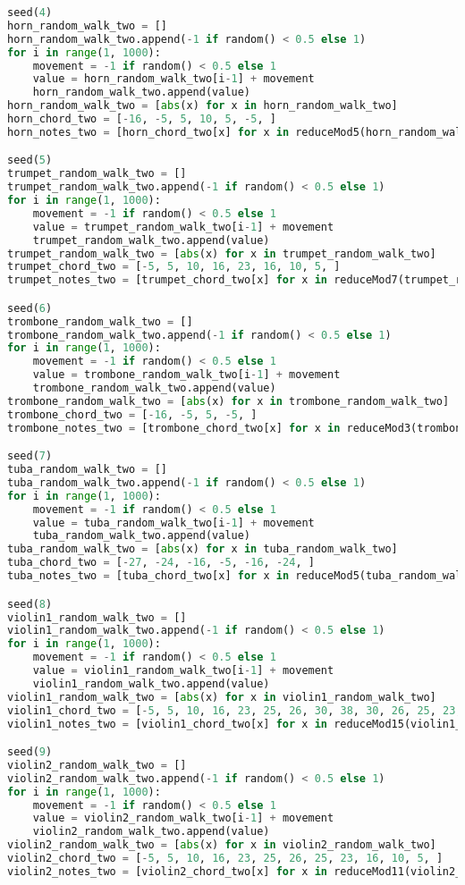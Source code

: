 \begin{lstlisting}[language=Python, caption=Tianshu Segment\_I]
seed(4)
horn_random_walk_two = []
horn_random_walk_two.append(-1 if random() < 0.5 else 1)
for i in range(1, 1000):
    movement = -1 if random() < 0.5 else 1
    value = horn_random_walk_two[i-1] + movement
    horn_random_walk_two.append(value)
horn_random_walk_two = [abs(x) for x in horn_random_walk_two]
horn_chord_two = [-16, -5, 5, 10, 5, -5, ]
horn_notes_two = [horn_chord_two[x] for x in reduceMod5(horn_random_walk_two)]

seed(5)
trumpet_random_walk_two = []
trumpet_random_walk_two.append(-1 if random() < 0.5 else 1)
for i in range(1, 1000):
    movement = -1 if random() < 0.5 else 1
    value = trumpet_random_walk_two[i-1] + movement
    trumpet_random_walk_two.append(value)
trumpet_random_walk_two = [abs(x) for x in trumpet_random_walk_two]
trumpet_chord_two = [-5, 5, 10, 16, 23, 16, 10, 5, ]
trumpet_notes_two = [trumpet_chord_two[x] for x in reduceMod7(trumpet_random_walk_two)]

seed(6)
trombone_random_walk_two = []
trombone_random_walk_two.append(-1 if random() < 0.5 else 1)
for i in range(1, 1000):
    movement = -1 if random() < 0.5 else 1
    value = trombone_random_walk_two[i-1] + movement
    trombone_random_walk_two.append(value)
trombone_random_walk_two = [abs(x) for x in trombone_random_walk_two]
trombone_chord_two = [-16, -5, 5, -5, ]
trombone_notes_two = [trombone_chord_two[x] for x in reduceMod3(trombone_random_walk_two)]

seed(7)
tuba_random_walk_two = []
tuba_random_walk_two.append(-1 if random() < 0.5 else 1)
for i in range(1, 1000):
    movement = -1 if random() < 0.5 else 1
    value = tuba_random_walk_two[i-1] + movement
    tuba_random_walk_two.append(value)
tuba_random_walk_two = [abs(x) for x in tuba_random_walk_two]
tuba_chord_two = [-27, -24, -16, -5, -16, -24, ]
tuba_notes_two = [tuba_chord_two[x] for x in reduceMod5(tuba_random_walk_two)]

seed(8)
violin1_random_walk_two = []
violin1_random_walk_two.append(-1 if random() < 0.5 else 1)
for i in range(1, 1000):
    movement = -1 if random() < 0.5 else 1
    value = violin1_random_walk_two[i-1] + movement
    violin1_random_walk_two.append(value)
violin1_random_walk_two = [abs(x) for x in violin1_random_walk_two]
violin1_chord_two = [-5, 5, 10, 16, 23, 25, 26, 30, 38, 30, 26, 25, 23, 16, 10, 5, ]
violin1_notes_two = [violin1_chord_two[x] for x in reduceMod15(violin1_random_walk_two)]

seed(9)
violin2_random_walk_two = []
violin2_random_walk_two.append(-1 if random() < 0.5 else 1)
for i in range(1, 1000):
    movement = -1 if random() < 0.5 else 1
    value = violin2_random_walk_two[i-1] + movement
    violin2_random_walk_two.append(value)
violin2_random_walk_two = [abs(x) for x in violin2_random_walk_two]
violin2_chord_two = [-5, 5, 10, 16, 23, 25, 26, 25, 23, 16, 10, 5, ]
violin2_notes_two = [violin2_chord_two[x] for x in reduceMod11(violin2_random_walk_two)]


\end{lstlisting}
